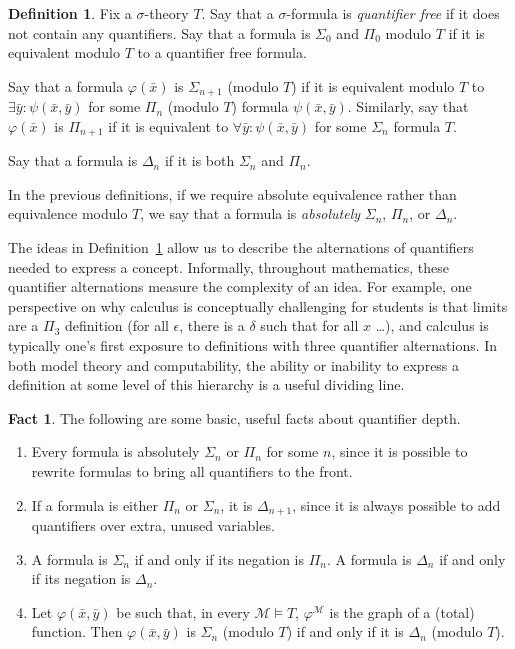 \documentclass{article}
\theoremstyle{plain}
\theoremstyle{definition}
\newtheorem{defn}[thm]{Definition}
\newtheorem{fact}[thm]{Fact}
\newcommand{\defterm}{\emph}
\newcommand{\tuple}{\bar}
\renewcommand{\phi}{\varphi}
\begin{document}
\begin{defn}\label{defn:quantifier-depth}
  Fix a $\sigma$-theory $T$. Say that a $\sigma$-formula is
  \defterm{quantifier free} if it does not contain any
  quantifiers. Say that a formula is $\Sigma_0$ and $\Pi_0$ modulo $T$
  if it is equivalent modulo $T$ to a quantifier free formula.

  Say that a formula $\phi(\tuple{x})$ is $\Sigma_{n+1}$ (modulo $T$)
  if it is equivalent modulo $T$ to $\exists \tuple{y} :
  \psi(\tuple{x}, \tuple{y})$ for some $\Pi_n$ (modulo $T$) formula
  $\psi(\tuple{x}, \tuple{y})$. Similarly, say that $\phi(\tuple{x})$
  is $\Pi_{n+1}$ if it is equivalent to $\forall \tuple{y} :
  \psi(\tuple{x}, \tuple{y})$ for some $\Sigma_n$ formula $T$.

  Say that a formula is $\Delta_n$ if it is both $\Sigma_n$ and
  $\Pi_n$.

  In the previous definitions, if we require absolute equivalence
  rather than equivalence modulo $T$, we say that a formula is
  \defterm{absolutely} $\Sigma_n$, $\Pi_n$, or $\Delta_n$.
\end{defn}

The ideas in Definition~\ref{defn:quantifier-depth} allow us to
describe the alternations of quantifiers needed to express a
concept. Informally, throughout mathematics, these quantifier
alternations measure the complexity of an idea. For example, one
perspective on why calculus is conceptually challenging for students
is that limits are a $\Pi_3$ definition (for all $\epsilon$, there is
a $\delta$ such that for all $x$ \ldots), and calculus is typically
one's first exposure to definitions with three quantifier
alternations. In both model theory and computability, the ability or
inability to express a definition at some level of this hierarchy is a
useful dividing line.

\begin{fact}\label{fact:qfhier-basic}
  The following are some basic, useful facts about quantifier depth.
  \begin{enumerate}
  \item Every formula is absolutely $\Sigma_n$ or $\Pi_n$ for some
    $n$, since it is possible to rewrite formulas to bring all
    quantifiers to the front.
  \item If a formula is either $\Pi_n$ or $\Sigma_n$, it is
    $\Delta_{n+1}$, since it is always possible to add quantifiers
    over extra, unused variables.
  \item A formula is $\Sigma_n$ if and only if its negation is
    $\Pi_n$. A formula is $\Delta_n$ if and only if its negation is
    $\Delta_n$.
  \item Let $\phi(\tuple{x}, \tuple{y})$ be such that, in every
    $\mathcal{M} \models T$, $\phi^\mathcal{M}$ is the graph of a
    (total) function. Then $\phi(\tuple{x},\tuple{y})$ is $\Sigma_n$
    (modulo $T$) if and only if it is $\Delta_n$ (modulo $T$).
  \end{enumerate}
\end{fact}
\end{document}
